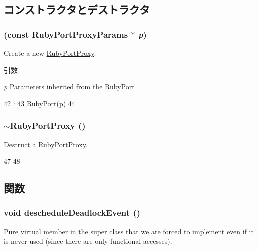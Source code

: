 \subsection{コンストラクタとデストラクタ}
\hypertarget{classRubyPortProxy_a565be517aac1eee5e1ab36bb4a2214ab}{
\subsubsection[{RubyPortProxy}]{ (const RubyPortProxyParams $\ast$ {\em p})}}
\label{classRubyPortProxy_a565be517aac1eee5e1ab36bb4a2214ab}
Create a new \hyperlink{classRubyPortProxy}{RubyPortProxy}.


\begin{DoxyParams}{引数}
\item[{\em p}]Parameters inherited from the \hyperlink{classRubyPort}{RubyPort} \end{DoxyParams}



\begin{DoxyCode}
42                                                          :
43     RubyPort(p) {
44 }

\end{DoxyCode}
\hypertarget{classRubyPortProxy_a7924d208d2536c85628f7cf205940c0a}{
\subsubsection[{$\sim$RubyPortProxy}]{\setlength{\rightskip}{0pt plus 5cm}$\sim${\bf RubyPortProxy} ()}}
\label{classRubyPortProxy_a7924d208d2536c85628f7cf205940c0a}
Destruct a \hyperlink{classRubyPortProxy}{RubyPortProxy}. 


\begin{DoxyCode}
47 {
48 }
\end{DoxyCode}


\subsection{関数}
\hypertarget{classRubyPortProxy_a7c9a8861621a62055761f47310814762}{
\subsubsection[{descheduleDeadlockEvent}]{\setlength{\rightskip}{0pt plus 5cm}void descheduleDeadlockEvent ()}}
\label{classRubyPortProxy_a7c9a8861621a62055761f47310814762}
Pure virtual member in the super class that we are forced to implement even if it is never used (since there are only functional accesses). 

